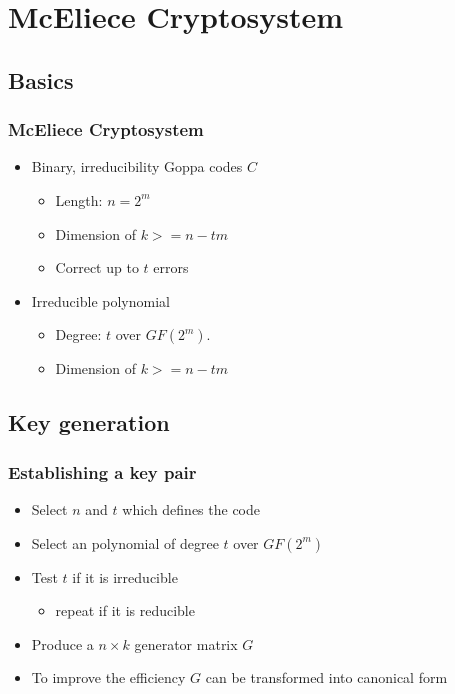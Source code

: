 \section[McEliece]{McEliece Cryptosystem}

	\subsection{Basics}
		\begin{frame}
			\frametitle{McEliece Cryptosystem}
			\begin{itemize}
				\item Binary, irreducibility Goppa codes $C$
				\begin{itemize}
					\item Length: $n = 2^m$
					\item Dimension of $k >= n - tm$
					\item Correct up to $t$ errors	
				\end{itemize}
				\item Irreducible polynomial 
				\begin{itemize}
					\item Degree: $t$ over $GF(2^m)$. 
					\item Dimension of $k >= n - tm$
				\end{itemize}				
			\end{itemize}
		\end{frame}

	\subsection{Key generation}
		\begin{frame}
			\frametitle{Establishing a key pair}
			\begin{itemize}
				\item Select $n$ and $t$ which defines the code
				\item Select an polynomial of degree $t$ over $GF(2^m)$
				\item Test $t$ if it is irreducible
				\begin{itemize}
					\item repeat if it is reducible
				\end{itemize}
				\item Produce a $n \times k$ generator matrix $G$
				\item To improve the efficiency $G$ can be transformed into canonical form
			\end{itemize}
		\end{frame}
	
